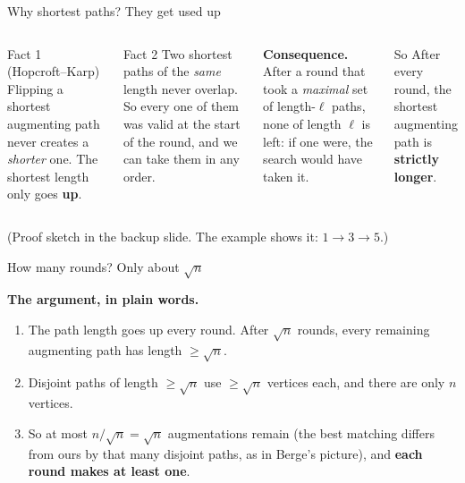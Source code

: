 \documentclass[aspectratio=169,11pt]{beamer}
\begin{document}
\begin{frame}{Why shortest paths? They get used up}
\begin{columns}[T]
\begin{block}{Fact 1 (Hopcroft--Karp)}
Flipping a shortest augmenting path never creates a \emph{shorter} one. The shortest length only goes \textbf{up}.
\end{block}
\begin{block}{Fact 2}
Two shortest paths of the \emph{same} length never overlap. So every one of them was valid at the start of the round, and we can take them in any order.
\end{block}
\textbf{Consequence.} After a round that took a \emph{maximal} set of length-$\ell$ paths, none of length $\ell$ is left: if one were, the search would have taken it.
\vspace{3mm}
\begin{alertblock}{So}
After every round, the shortest augmenting path is \textbf{strictly longer}.
\end{alertblock}
\end{columns}
\vspace{3mm}
{\small (Proof sketch in the backup slide. The example shows it: $1\to3\to5$.)}
\end{frame}

\begin{frame}{How many rounds? Only about $\sqrt n$}
\centering
{}
\vspace{2mm}

\raggedright
\textbf{The argument, in plain words.}
\begin{enumerate}\setlength\itemsep{5pt}
  \item The path length goes up every round. After $\sqrt n$ rounds, every remaining augmenting path has length $\ge\sqrt n$.
  \item Disjoint paths of length $\ge\sqrt n$ use $\ge\sqrt n$ vertices each, and there are only $n$ vertices.
  \item So at most $n/\sqrt n=\sqrt n$ augmentations remain (the best matching differs from ours by that many disjoint paths, as in Berge's picture), and \textbf{each round makes at least one}.
\end{enumerate}
\end{frame}
\end{document}
